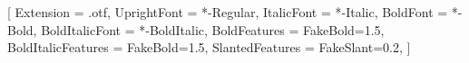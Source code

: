\setmainfont{GaramondLibre}[
    Extension               = .otf,
    UprightFont             = *-Regular,
    ItalicFont              = *-Italic,
    BoldFont                = *-Bold,
    BoldItalicFont          = *-BoldItalic,
    BoldFeatures            = {FakeBold=1.5},
    BoldItalicFeatures      = {FakeBold=1.5},
    SlantedFeatures         = {FakeSlant=0.2},
]








